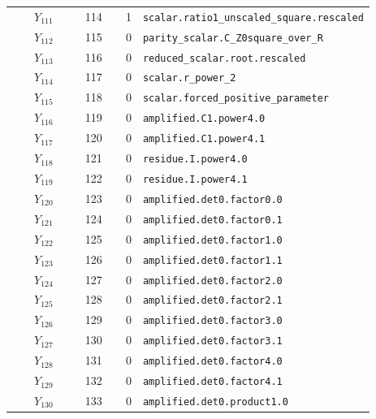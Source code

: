 {\begin{longtable}{@{}r r r p{0.64\linewidth}@{}}
\(Y_{111}\) & 114 & 1 & \texttt{scalar.\allowbreak{}ratio1\_unscaled\_square.\allowbreak{}rescaled} \\
\(Y_{112}\) & 115 & 0 & \texttt{parity\_scalar.\allowbreak{}C\_Z0square\_over\_R} \\
\(Y_{113}\) & 116 & 0 & \texttt{reduced\_scalar.\allowbreak{}root.\allowbreak{}rescaled} \\
\(Y_{114}\) & 117 & 0 & \texttt{scalar.\allowbreak{}r\_power\_2} \\
\(Y_{115}\) & 118 & 0 & \texttt{scalar.\allowbreak{}forced\_positive\_parameter} \\
\(Y_{116}\) & 119 & 0 & \texttt{amplified.\allowbreak{}C1.\allowbreak{}power4.\allowbreak{}0} \\
\(Y_{117}\) & 120 & 0 & \texttt{amplified.\allowbreak{}C1.\allowbreak{}power4.\allowbreak{}1} \\
\(Y_{118}\) & 121 & 0 & \texttt{residue.\allowbreak{}I.\allowbreak{}power4.\allowbreak{}0} \\
\(Y_{119}\) & 122 & 0 & \texttt{residue.\allowbreak{}I.\allowbreak{}power4.\allowbreak{}1} \\
\(Y_{120}\) & 123 & 0 & \texttt{amplified.\allowbreak{}det0.\allowbreak{}factor0.\allowbreak{}0} \\
\(Y_{121}\) & 124 & 0 & \texttt{amplified.\allowbreak{}det0.\allowbreak{}factor0.\allowbreak{}1} \\
\(Y_{122}\) & 125 & 0 & \texttt{amplified.\allowbreak{}det0.\allowbreak{}factor1.\allowbreak{}0} \\
\(Y_{123}\) & 126 & 0 & \texttt{amplified.\allowbreak{}det0.\allowbreak{}factor1.\allowbreak{}1} \\
\(Y_{124}\) & 127 & 0 & \texttt{amplified.\allowbreak{}det0.\allowbreak{}factor2.\allowbreak{}0} \\
\(Y_{125}\) & 128 & 0 & \texttt{amplified.\allowbreak{}det0.\allowbreak{}factor2.\allowbreak{}1} \\
\(Y_{126}\) & 129 & 0 & \texttt{amplified.\allowbreak{}det0.\allowbreak{}factor3.\allowbreak{}0} \\
\(Y_{127}\) & 130 & 0 & \texttt{amplified.\allowbreak{}det0.\allowbreak{}factor3.\allowbreak{}1} \\
\(Y_{128}\) & 131 & 0 & \texttt{amplified.\allowbreak{}det0.\allowbreak{}factor4.\allowbreak{}0} \\
\(Y_{129}\) & 132 & 0 & \texttt{amplified.\allowbreak{}det0.\allowbreak{}factor4.\allowbreak{}1} \\
\(Y_{130}\) & 133 & 0 & \texttt{amplified.\allowbreak{}det0.\allowbreak{}product1.\allowbreak{}0} \\

\end{longtable}}
